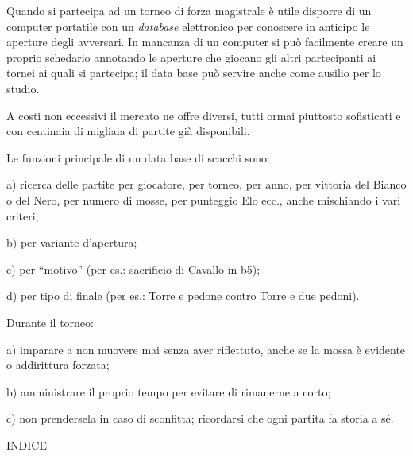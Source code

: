\documentclass[
]{article}
\begin{document}
Quando si partecipa ad un torneo di forza magistrale è utile disporre di
un computer portatile con un \emph{database} elettronico per conoscere
in anticipo le aperture degli avversari. In mancanza di un computer si
può facilmente creare un proprio schedario annotando le aperture che
giocano gli altri partecipanti ai tornei ai quali si partecipa; il data
base può servire anche come ausilio per lo studio.

A costi non eccessivi il mercato ne offre diversi, tutti ormai piuttosto
sofisticati e con centinaia di migliaia di partite già disponibili.

Le funzioni principale di un data base di scacchi sono:

a) ricerca delle partite per giocatore, per torneo, per anno, per
vittoria del Bianco o del Nero, per numero di mosse, per punteggio Elo
ecc., anche mischiando i vari criteri;

b) per variante d'apertura;

c) per ``motivo'' (per es.: sacrificio di Cavallo in b5);

d) per tipo di finale (per es.: Torre e pedone contro Torre e due
pedoni).

Durante il torneo:

a) imparare a non muovere mai senza aver riflettuto, anche se la mossa è
evidente o addirittura forzata;

b) amministrare il proprio tempo per evitare di rimanerne a corto;

c) non prendersela in caso di sconfitta; ricordarsi che ogni partita fa
storia a sé.

INDICE
\end{document}

